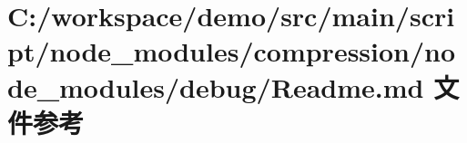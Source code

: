 \hypertarget{node__modules_2compression_2node__modules_2debug_2_r_e_a_d_m_e_8md}{}\section{C\+:/workspace/demo/src/main/script/node\+\_\+modules/compression/node\+\_\+modules/debug/\+Readme.md 文件参考}
\label{node__modules_2compression_2node__modules_2debug_2_r_e_a_d_m_e_8md}
